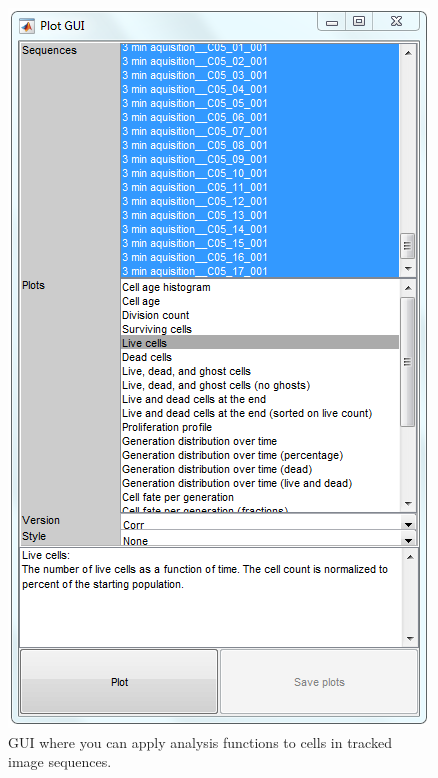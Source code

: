 \documentclass[a4paper, oneside, onecolumn, 11pt]{article}
\begin{document}
\begin{figure}[!htb]
\begin{center}
\includegraphics[width = 0.5\columnwidth]{figures/plotGUI}
\caption{GUI where you can apply analysis functions to cells in tracked image sequences.}
\label{fig:plot-GUI}
\end{center}
\end{figure}
\end{document}
